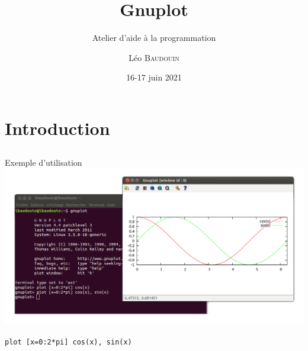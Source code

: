 \documentclass{beamer}
\title{Gnuplot}
\subtitle{Atelier d'aide à la programmation}
\author{L\'eo \textsc{Baudouin}}
\institute{
  {\url{baudouin.leo @ gmail.com}}
}
\date{16-17 juin 2021}
\begin{document}
\begin{frame}
  \titlepage
\end{frame}

\section{Introduction}
\subsection{}

\begin{frame}{Exemple d'utilisation}
\includegraphics[width=\linewidth]{images/gnuplot-exemple}

\begin{center}
\verb?plot [x=0:2*pi] cos(x), sin(x)?
\end{center}
\end{frame}
\end{document}

